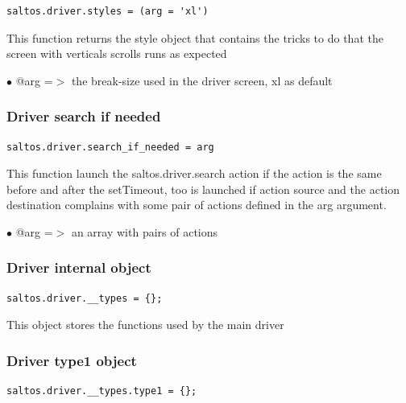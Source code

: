 \documentclass[a4paper]{article}
\begin{document}
\begin{lstlisting}
saltos.driver.styles = (arg = 'xl')
\end{lstlisting}

This function returns the style object that contains the tricks to do
that the screen with verticals scrolls runs as expected

\begin{compactitem}
\item[\color{myblue}$\bullet$] @arg =$>$ the break-size used in the driver screen, xl as default
\end{compactitem}

\hypertarget{toc180}{}
\subsubsection{Driver search if needed}

\begin{lstlisting}
saltos.driver.search_if_needed = arg
\end{lstlisting}

This function launch the saltos.driver.search action if the action is the
same before and after the setTimeout, too is launched if action source and
the action destination complains with some pair of actions defined in the
arg argument.

\begin{compactitem}
\item[\color{myblue}$\bullet$] @arg =$>$ an array with pairs of actions
\end{compactitem}

\hypertarget{toc181}{}
\subsubsection{Driver internal object}

\begin{lstlisting}
saltos.driver.__types = {};
\end{lstlisting}

This object stores the functions used by the main driver

\hypertarget{toc182}{}
\subsubsection{Driver type1 object}

\begin{lstlisting}
saltos.driver.__types.type1 = {};
\end{lstlisting}
\end{document}
